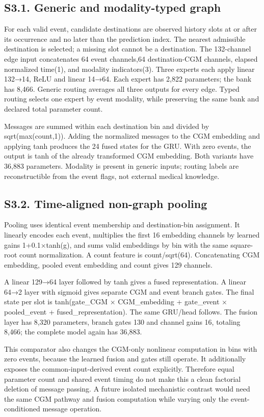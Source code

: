 \documentclass[11pt,a4paper]{article}
\begin{document}
\subsection*{S3.1. Generic and modality-typed graph}
For each valid event, candidate destinations are observed history slots at or after its occurrence and no later than the prediction index. The nearest admissible destination is selected; a missing slot cannot be a destination. The 132-channel edge input concatenates 64 event channels,64 destination-CGM channels, elapsed normalized time(1), and modality indicators(3). Three experts each apply linear 132→14, ReLU and linear 14→64. Each expert has 2,822 parameters; the bank has 8,466. Generic routing averages all three outputs for every edge. Typed routing selects one expert by event modality, while preserving the same bank and declared total parameter count.

Messages are summed within each destination bin and divided by sqrt(max(count,1)). Adding the normalized messages to the CGM embedding and applying tanh produces the 24 fused states for the GRU. With zero events, the output is tanh of the already transformed CGM embedding. Both variants have 36,883 parameters. Modality is present in generic inputs; routing labels are reconstructible from the event flags, not external medical knowledge.

\subsection*{S3.2. Time-aligned non-graph pooling}
Pooling uses identical event membership and destination-bin assignment. It linearly encodes each event, multiplies the first 16 embedding channels by learned gains 1+0.1$\times$tanh(g), and sums valid embeddings by bin with the same square-root count normalization. A count feature is count/sqrt(64). Concatenating CGM embedding, pooled event embedding and count gives 129 channels.

A linear 129→64 layer followed by tanh gives a fused representation. A linear 64→2 layer with sigmoid gives separate CGM and event branch gates. The final state per slot is tanh(gate\_\allowbreak{}CGM $\times$ CGM\_\allowbreak{}embedding + gate\_\allowbreak{}event $\times$ pooled\_\allowbreak{}event + fused\_\allowbreak{}representation). The same GRU/head follows. The fusion layer has 8,320 parameters, branch gates 130 and channel gains 16, totaling 8,466; the complete model again has 36,883.

This comparator also changes the CGM-only nonlinear computation in bins with zero events, because the learned fusion and gates still operate. It additionally exposes the common-input-derived event count explicitly. Therefore equal parameter count and shared event timing do not make this a clean factorial deletion of message passing. A future isolated mechanistic contrast would need the same CGM pathway and fusion computation while varying only the event-conditioned message operation.
\end{document}
